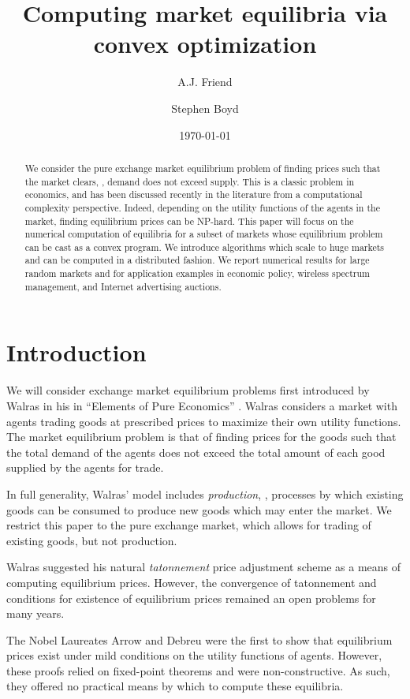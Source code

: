 \documentclass[12pt]{article}
\title{Computing market equilibria via convex optimization}
\author{A.J. Friend \and Stephen Boyd}
\date{\today}
\begin{document}
\maketitle

\begin{abstract}
We consider the pure exchange market equilibrium problem of finding prices
such that the market clears, \ie, demand does not exceed supply.
This is a classic problem in economics, and has been discussed recently
in the literature from a computational complexity perspective.
Indeed, depending on the utility functions of the agents in the market,
finding equilibrium prices can be NP-hard.
This paper will focus on the numerical computation
of equilibria for a subset of markets whose equilibrium
problem can be cast as a convex program.
We introduce algorithms which scale to huge markets and can be computed
in a distributed fashion.
We report numerical results for large random markets and for
application examples in economic policy, wireless spectrum management,
and Internet advertising auctions.
\end{abstract}

\newpage
\tableofcontents
\newpage

\section{Introduction}
We will consider exchange market equilibrium problems first introduced by
Walras in his in ``Elements of Pure Economics''
\cite{walras1896elements}.
Walras considers a market with agents trading
goods at prescribed prices to maximize their own utility functions.
The market equilibrium problem is that of finding prices for the goods
such that the total demand of the agents does not exceed the total amount
of each good supplied by the agents for trade.

In full generality, Walras' model includes \emph{production}, \ie, processes by which existing goods can be consumed to produce new goods which may enter the market.
We restrict this paper to the pure exchange market, which allows for trading of existing goods, but not production.

Walras suggested his natural \emph{tatonnement} price adjustment scheme as a means of computing equilibrium prices.
However, the convergence of tatonnement and conditions for existence of equilibrium prices remained an open problems for many years.

The Nobel Laureates Arrow and Debreu were the first to show that equilibrium
prices exist under mild conditions on the utility functions of agents\cite{arrow1954existence}.
However, these proofs relied on fixed-point theorems and were non-constructive.
As such, they offered no practical means by which to compute these equilibria.
\end{document}
